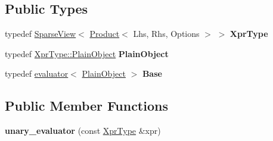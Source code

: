 \subsection*{Public Types}
\begin{DoxyCompactItemize}
\item 
\mbox{\label{struct_eigen_1_1internal_1_1unary__evaluator_3_01_sparse_view_3_01_product_3_01_lhs_00_01_rhs_00009027121becdbd7ae7cc0d8a4c63ed7_a2e5dc5bf23eb931fc5c185962a09ada6}} 
typedef \mbox{\hyperlink{class_eigen_1_1_sparse_view}{Sparse\+View}}$<$ \mbox{\hyperlink{class_eigen_1_1_product}{Product}}$<$ Lhs, Rhs, Options $>$ $>$ {\bfseries Xpr\+Type}
\item 
\mbox{\label{struct_eigen_1_1internal_1_1unary__evaluator_3_01_sparse_view_3_01_product_3_01_lhs_00_01_rhs_00009027121becdbd7ae7cc0d8a4c63ed7_a6c295c293186a2489a4314e2b0705307}} 
typedef \mbox{\hyperlink{class_eigen_1_1_sparse_matrix}{Xpr\+Type\+::\+Plain\+Object}} {\bfseries Plain\+Object}
\item 
\mbox{\label{struct_eigen_1_1internal_1_1unary__evaluator_3_01_sparse_view_3_01_product_3_01_lhs_00_01_rhs_00009027121becdbd7ae7cc0d8a4c63ed7_a2ac684434ecfd71287c901da09822627}} 
typedef \mbox{\hyperlink{struct_eigen_1_1internal_1_1evaluator}{evaluator}}$<$ \mbox{\hyperlink{class_eigen_1_1_sparse_matrix}{Plain\+Object}} $>$ {\bfseries Base}
\end{DoxyCompactItemize}
\subsection*{Public Member Functions}
\begin{DoxyCompactItemize}
\item 
\mbox{\label{struct_eigen_1_1internal_1_1unary__evaluator_3_01_sparse_view_3_01_product_3_01_lhs_00_01_rhs_00009027121becdbd7ae7cc0d8a4c63ed7_a82f50e8685604a2602665e58167a2b4e}} 
{\bfseries unary\+\_\+evaluator} (const \mbox{\hyperlink{class_eigen_1_1_sparse_view}{Xpr\+Type}} \&xpr)
\end{DoxyCompactItemize}
